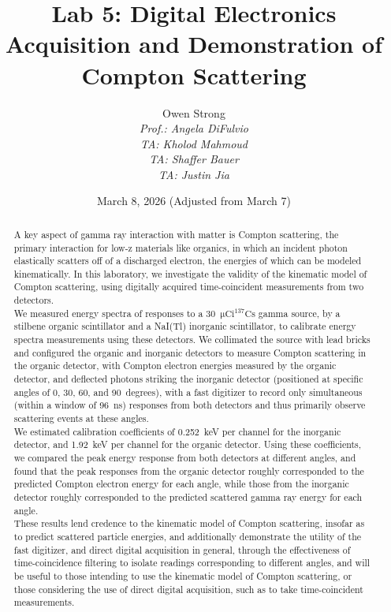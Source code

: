 \documentclass[12pt]{article}
\title{Lab 5: Digital Electronics Acquisition and Demonstration of Compton Scattering}
\author{Owen Strong \\
\itshape Prof.: Angela DiFulvio\\
\itshape TA: Kholod Mahmoud \\
\itshape TA: Shaffer Bauer \\
\itshape TA: Justin Jia \\
}
\date{March 8, 2026 (Adjusted from March 7)}
\newcommand{\micCi}{$\mathrm{\mu Ci}$\xspace}
\newcommand{\CsSrc}{$\mathrm{^{137}Cs}$\xspace}
\begin{document}
\maketitle
\pagebreak
{\hypersetup{linkcolor=black}\tableofcontents}
\pagebreak
{}
\begin{abstract}
    A key aspect of gamma ray interaction with matter is Compton scattering, the primary interaction for low-z materials like organics, in which an incident photon elastically scatters off of a discharged electron, the energies of which can be modeled kinematically.
    In this laboratory, we investigate the validity of the kinematic model of Compton scattering, using digitally acquired time-coincident measurements from two detectors.\\
    
    We measured energy spectra of responses to a 30~\micCi \CsSrc gamma source, by a stilbene organic scintillator and a NaI(Tl) inorganic scintillator, to calibrate energy spectra measurements using these detectors.
    We collimated the source with lead bricks and configured the organic and inorganic detectors to measure Compton scattering in the organic detector, with Compton electron energies measured by the organic detector, and deflected photons striking the inorganic detector (positioned at specific angles of 0, 30, 60, and 90~degrees), with a fast digitizer to record only simultaneous (within a window of 96~ns) responses from both detectors and thus primarily observe scattering events at these angles.\\

    We estimated calibration coefficients of 0.252~keV per channel for the inorganic detector, and 1.92~keV per channel for the organic detector.
    Using these coefficients, we compared the peak energy response from both detectors at different angles, and found that the peak responses from the organic detector roughly corresponded to the predicted Compton electron energy for each angle, while those from the inorganic detector roughly corresponded to the predicted scattered gamma ray energy for each angle.\\

    These results lend credence to the kinematic model of Compton scattering, insofar as to predict scattered particle energies, and additionally demonstrate the utility of the fast digitizer, and direct digital acquisition in general, through the effectiveness of time-coincidence filtering to isolate readings corresponding to different angles, and will be useful to those intending to use the kinematic model of Compton scattering, or those considering the use of direct digital acquisition, such as to take time-coincident measurements.

\end{abstract}
\end{document}
